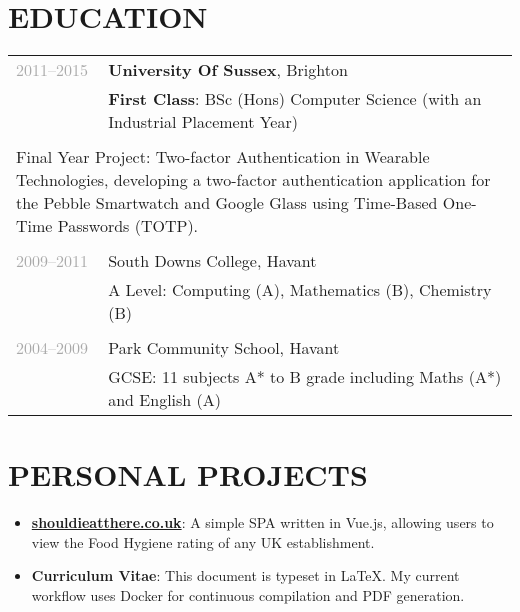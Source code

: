 \documentclass{article}
\newenvironment{exptable}{
  \begin{longtable}{lp{0.8\textwidth}}
  }{
  \end{longtable}
}
\begin{document}
  \section*{EDUCATION}
    \begin{exptable}
      \textcolor{darkgray}{2011--2015} & {\bf University Of Sussex}, Brighton \\
                 & {\bf First Class}: BSc (Hons) Computer Science (with an Industrial Placement Year) \\
                 & \\
      \multicolumn{2}{p{\textwidth}}{
      Final Year Project: Two-factor Authentication in Wearable Technologies, developing a two-factor authentication application for the Pebble Smartwatch and Google Glass using Time-Based One-Time Passwords (TOTP).
      } \\
                 & \\
      \textcolor{darkgray}{2009--2011} & South Downs College, Havant \\
                 & A Level: Computing (A), Mathematics (B), Chemistry (B) \\
                 & \\
      \textcolor{darkgray}{2004--2009} & Park Community School, Havant \\
                 & GCSE: 11 subjects A* to B grade including Maths (A*) and English (A)
    \end{exptable}

 \section*{PERSONAL PROJECTS}
 \vspace{1em}
  \begin{itemize}
    \item \href{http://shouldieatthere.co.uk}{\textbf{shouldieatthere.co.uk}}: A simple SPA written in Vue.js, allowing users to view the Food Hygiene rating of any UK establishment.
    \item \textbf{Curriculum Vitae}: This document is typeset in LaTeX. My current workflow uses Docker for continuous compilation and PDF generation.
  \end{itemize}
 \vspace{1em}
\end{document}
